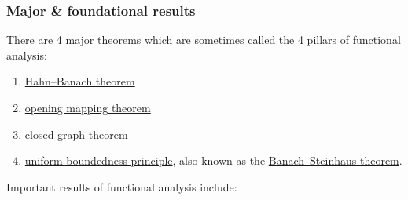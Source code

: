 \documentclass{article}
\begin{document}
\subsubsection{Major \& foundational results}
There are 4 major theorems which are sometimes called the 4 pillars of functional analysis:
\begin{enumerate}
	\item \href{https://en.wikipedia.org/wiki/Hahn%E2%80%93Banach_theorem}{Hahn--Banach theorem}
	\item \href{https://en.wikipedia.org/wiki/Open_mapping_theorem_(functional_analysis)}{opening mapping theorem}
	\item \href{https://en.wikipedia.org/wiki/Closed_graph_theorem_(functional_analysis)}{closed graph theorem}
	\item \href{https://en.wikipedia.org/wiki/Uniform_boundedness_principle}{uniform boundedness principle}, also known as the \href{https://en.wikipedia.org/wiki/Banach%E2%80%93Steinhaus_theorem}{Banach--Steinhaus theorem}.
\end{enumerate}
Important results of functional analysis include:
\end{document}
